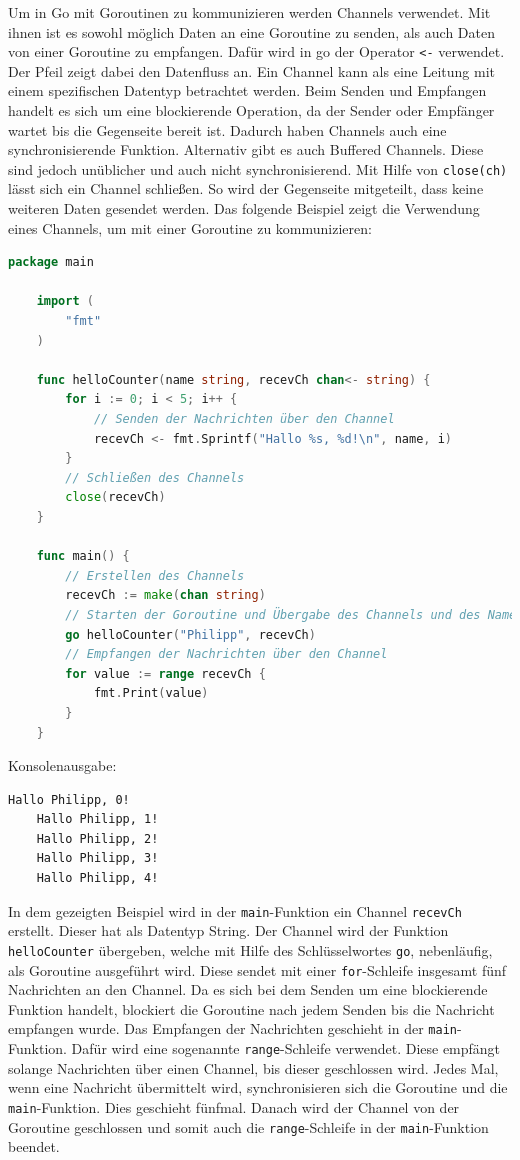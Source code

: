 \documentclass[fontsize=12pt,paper=a4,twoside=semi,parskip=half-,headsepline,headinclude]{scrreprt}
\begin{document}
Um in Go mit Goroutinen zu kommunizieren werden Channels\cite{donovan2015} verwendet. Mit ihnen ist es sowohl möglich Daten an eine Goroutine zu senden, als auch Daten von einer Goroutine zu empfangen. Dafür wird in go der Operator \texttt{<-} verwendet. Der Pfeil zeigt dabei den Datenfluss an. Ein Channel kann als eine Leitung mit einem spezifischen Datentyp betrachtet werden. Beim Senden und Empfangen handelt es sich um eine blockierende Operation, da der Sender oder Empfänger wartet bis die Gegenseite bereit ist. Dadurch haben Channels auch eine synchronisierende Funktion. Alternativ gibt es auch Buffered Channels. Diese sind jedoch unüblicher und auch nicht synchronisierend. Mit Hilfe von \texttt{close(ch)} lässt sich ein Channel schließen. So wird der Gegenseite mitgeteilt, dass keine weiteren Daten gesendet werden. Das folgende Beispiel zeigt die Verwendung eines Channels, um mit einer Goroutine zu kommunizieren:

\begin{lstlisting}[language=Go,extendedchars=true]
	package main

	import (
		"fmt"
	)

	func helloCounter(name string, recevCh chan<- string) {
		for i := 0; i < 5; i++ {
			// Senden der Nachrichten über den Channel
			recevCh <- fmt.Sprintf("Hallo %s, %d!\n", name, i)
		}
		// Schließen des Channels
		close(recevCh)
	}

	func main() {
		// Erstellen des Channels
		recevCh := make(chan string)
		// Starten der Goroutine und Übergabe des Channels und des Namens
		go helloCounter("Philipp", recevCh)
		// Empfangen der Nachrichten über den Channel
		for value := range recevCh {
			fmt.Print(value)
		}
	}
\end{lstlisting}
Konsolenausgabe:
\begin{lstlisting}[frame=shadowbox, rulecolor=\color{black}, backgroundcolor=\color{gray!10}]
	Hallo Philipp, 0!
	Hallo Philipp, 1!
	Hallo Philipp, 2!
	Hallo Philipp, 3!
	Hallo Philipp, 4!
\end{lstlisting}

In dem gezeigten Beispiel wird in der \texttt{main}-Funktion ein Channel \texttt{recevCh} erstellt. Dieser hat als Datentyp String. Der Channel wird der Funktion \texttt{helloCounter} übergeben, welche mit Hilfe des Schlüsselwortes \texttt{go}, nebenläufig, als Goroutine ausgeführt wird. Diese sendet mit einer \texttt{for}-Schleife insgesamt fünf Nachrichten an den Channel. Da es sich bei dem Senden um eine blockierende Funktion handelt, blockiert die Goroutine nach jedem Senden bis die Nachricht empfangen wurde. Das Empfangen der Nachrichten geschieht in der \texttt{main}-Funktion. Dafür wird eine sogenannte \texttt{range}-Schleife verwendet. Diese empfängt solange Nachrichten über einen Channel, bis dieser geschlossen wird.  Jedes Mal, wenn eine Nachricht übermittelt wird, synchronisieren sich die Goroutine und die \texttt{main}-Funktion. Dies geschieht fünfmal. Danach wird der Channel von der Goroutine geschlossen und somit auch die \texttt{range}-Schleife in der \texttt{main}-Funktion beendet.
\end{document}
